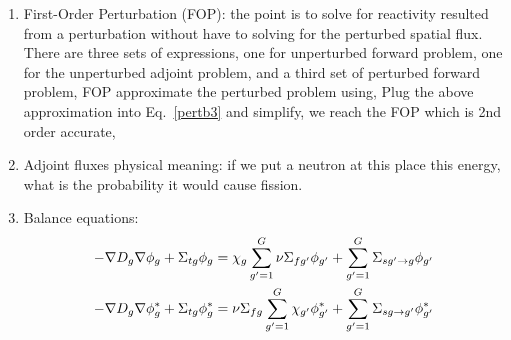\documentclass{school-22.211-notes}
\begin{document}
\clearpage
{}
\begin{enumerate}
\item  First-Order Perturbation (FOP): the point is to solve for reactivity resulted from a perturbation without have to solving for the perturbed spatial flux. There are three sets of expressions, one for unperturbed forward problem, one for the unperturbed adjoint problem,
and a third set of perturbed forward problem, 
FOP approximate the perturbed problem using, 
Plug the above approximation into Eq.~\ref{pertb3} and simplify, we reach the FOP which is 2nd order accurate, 

\item Adjoint fluxes physical meaning: if we put a neutron at this place this energy, what is the probability it would cause fission.

  \item Balance equations:
    \begin{align}
      -\nabla D_g  \nabla \phi_g + \Sigma_{tg} \phi_g &= \chi_g \displaystyle\sum_{g'=1}^G \nu \Sigma_{fg'}  \phi_{g'} + \displaystyle\sum_{g'=1}^G \Sigma_{sg'\to g} \phi_{g'} \\
      -\nabla D_g  \nabla \phi_g^* + \Sigma_{tg}  \phi_g^* &= \nu \Sigma_{fg}  \displaystyle\sum_{g'=1}^G  \chi_{g'} \phi_{g'}^*  + \displaystyle\sum_{g'=1}^G \Sigma_{sg\to g'}  \phi_{g'}^*
    \end{align}


\end{enumerate}
\end{document}
